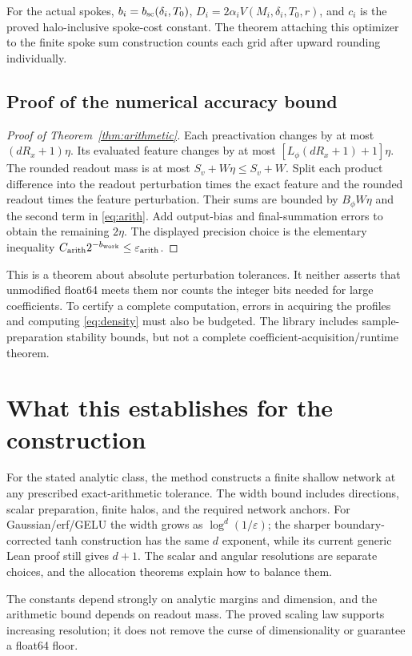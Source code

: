 \documentclass[11pt,letterpaper]{article}
\newcommand{\eps}{\varepsilon}
\theoremstyle{definition}
\theoremstyle{remark}
\begin{document}
For the actual spokes,
\(b_i=b_{\rm sc}(\delta_i,T_0)\),
\(D_i=2\alpha_iV(M_i,\delta_i,T_0,r)\), and \(c_i\) is the proved
halo-inclusive spoke-cost constant. The theorem attaching this optimizer to
the finite spoke sum construction counts each grid after upward rounding individually.

\subsection{Proof of the numerical accuracy bound}
\begin{proof}[Proof of Theorem~\ref{thm:arithmetic}]
Each preactivation changes by at most \((dR_x+1)\eta\).
Its evaluated feature changes by at most
\([L_\phi(dR_x+1)+1]\eta\).
The rounded readout mass is at most \(S_v+W\eta\le S_v+W\).
Split each product difference into the readout perturbation times the exact
feature and the rounded readout times the feature perturbation.
Their sums are bounded by \(B_\phi W\eta\) and the second term in
\eqref{eq:arith}. Add output-bias and final-summation errors to obtain the
remaining \(2\eta\). The displayed precision choice is the elementary
inequality \(C_{\rm arith}2^{-b_{\rm work}}\le\eps_{\rm arith}\).
\end{proof}
This is a theorem about absolute perturbation tolerances.
It neither asserts that unmodified float64 meets them nor counts the integer
bits needed for large coefficients. To certify a complete computation, errors
in acquiring the profiles and computing \eqref{eq:density} must also be budgeted.
The library includes sample-preparation stability bounds, but not a complete
coefficient-acquisition/runtime theorem.

\section{What this establishes for the construction}
For the stated analytic class, the method constructs a finite shallow network
at any prescribed exact-arithmetic tolerance. The width bound includes
directions, scalar preparation, finite halos, and the required network anchors.
For Gaussian/erf/GELU the width grows as \(\log^d(1/\eps)\); the sharper boundary-corrected
tanh construction has the same \(d\) exponent, while its current generic Lean
proof still gives \(d+1\). The scalar and angular resolutions are
separate choices, and the allocation theorems explain how to balance them.

The constants depend strongly on analytic margins and
dimension, and the arithmetic bound depends on readout mass. The proved
scaling law supports increasing resolution; it does not remove the curse of
dimensionality or guarantee a float64 floor.
\end{document}
